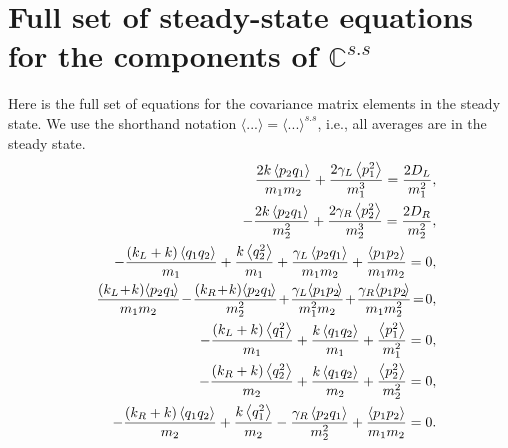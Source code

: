 
\chapter{Full set of steady-state equations for the components of $\mathbb{C}^{s.s}$}
\label{Appendix:SteadyStateEquations}

Here is the full set of equations for the covariance matrix elements in the steady state.
We use the shorthand notation $\langle ... \rangle=\langle ... \rangle^{s.s}$, i.e., all averages are
in the steady state.
%
  \begin{eqnarray}
&&      \frac{2 k \expval{ p_2 q_1} }{m_1 m_2}+\frac{2 \gamma _L \expval{ p_1^2} }{m_1^3}=\frac{2 D_L}{m_1^2},
      \nonumber\\
&&      -\frac{2 k \expval{ p_2 q_1} }{m_2^2}+\frac{2 \gamma _R \expval{ p_2^2} }{m_2^3}=\frac{2 D_R}{m_2^2},
       \nonumber\\
&&      -\frac{\left(k_L+k\right) \expval{ q_1 q_2}}{m_1}+\frac{k \expval{ q_2^2} }{m_1}+\frac{\gamma _L \expval{ p_2 q_1}}{m_1 m_2}+\frac{\expval{ p_1 p_2} }{m_1 m_2}=0,
       \nonumber\\
&&      \frac{\left(k_L\!+\!k\right)\! \expval{ p_2 q_1\!}}{m_1 m_2}\!-\!\frac{\left(k_R\!+\!k\right)\! \expval{ p_2 q_1\!}}{m_2^2}\!+\!\frac{\gamma _L \!\expval{ p_1 p_2\!}}{m_1^2 m_2}\!+\!\frac{\gamma _R\! \expval{ p_1 p_2\!}}{m_1 m_2^2}\!=\!0,
       \nonumber\\
&&      -\frac{\left(k_L+k\right) \expval{ q_1^2}}{m_1}+\frac{k \expval{ q_1 q_2} }{m_1}+\frac{\expval{ p_1^2} }{m_1^2}=0,
       \nonumber\\
&&      -\frac{\left(k_R+k\right) \expval{ q_2^2} }{m_2}+\frac{k \expval{ q_1 q_2} }{m_2}+\frac{\expval{ p_2^2} }{m_2^2}=0,
       \nonumber\\
&&      -\frac{\left(k_R+k\right) \expval{ q_1 q_2} }{m_2}+\frac{k \expval{ q_1^2} }{m_2}-\frac{\gamma _R \expval{ p_2 q_1}}{m_2^2}+\frac{\expval{ p_1 p_2}}{m_1 m_2}=0.
\nonumber
    \label{eq:SteadyStateEquationsModelB_Explicite}
  \end{eqnarray}
